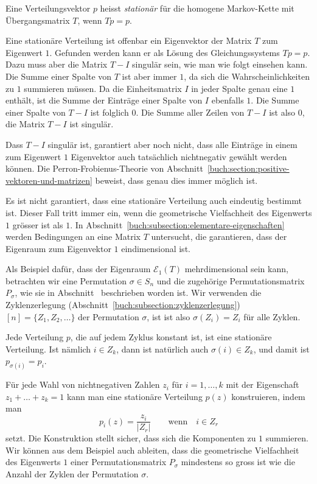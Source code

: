 \begin{definition}
Eine Verteilungsvektor $p$ heisst {\em stationär} für die
homogene Markov-Kette mit Übergangsmatrix $T$, wenn $Tp=p$.
%
\end{definition}

Eine stationäre Verteilung ist offenbar ein Eigenvektor der Matrix
$T$ zum Eigenwert $1$.
Gefunden werden kann er als Lösung des Gleichungssystems $Tp=p$.
Dazu muss aber die Matrix $T-I$ singulär sein, wie man wie folgt
einsehen kann.
Die Summe einer Spalte von $T$ ist aber immer $1$, da sich die
Wahrscheinlichkeiten zu $1$ summieren müssen.
Da die Einheitsmatrix $I$ in jeder Spalte
genau eine $1$ enthält, ist die Summe der Einträge einer Spalte von
$I$ ebenfalls $1$.
Die Summe einer Spalte von $T-I$ ist folglich $0$.
Die Summe aller Zeilen von $T-I$ ist also $0$, die Matrix $T-I$ 
ist singulär.

Dass $T-I$ singulär ist, garantiert aber noch nicht,
dass alle Einträge in einem zum Eigenwert $1$
Eigenvektor auch tatsächlich nichtnegativ gewählt werden können.
Die Perron-Frobienus-Theorie von
%
Abschnitt~\ref{buch:section:positive-vektoren-und-matrizen}
beweist, dass genau dies immer möglich ist.

Es ist nicht garantiert, dass eine stationäre Verteilung
auch eindeutig bestimmt ist.
Dieser Fall tritt immer ein, wenn die geometrische Vielfachheit
des Eigenwerts $1$ grösser ist als $1$.
In Abschnitt~\ref{buch:subsection:elementare-eigenschaften}
werden Bedingungen an eine Matrix $T$ untersucht, die garantieren,
dass der Eigenraum zum Eigenvektor $1$ eindimensional ist.

\begin{beispiel}
Als Beispiel dafür, dass der Eigenraum $\mathcal{E}_1(T)$
mehrdimensional sein kann, betrachten wir eine Permutation $\sigma\in S_n$
%
und die zugehörige Permutationsmatrix $P_\sigma$,
%
wie sie in Abschnitt~\label{buch:section:permutationsmatrizen}
beschrieben worden ist.
Wir verwenden die 
Zyklenzerlegung (Abschnitt~\ref{buch:subsection:zyklenzerlegung})
\(
[n] = \{ Z_1, Z_2,\dots \}
\)
der Permutation $\sigma$, ist ist also $\sigma(Z_i) = Z_i$ für alle
Zyklen.

Jede Verteilung $p$, die auf jedem Zyklus konstant ist, ist eine
stationäre Verteilung.
Ist nämlich $i\in Z_k$, dann ist natürlich auch $\sigma(i)\in Z_k$,
und damit ist $p_{\sigma(i)}=p_i$.

Für jede Wahl von nichtnegativen Zahlen $z_i$ für $i=1,\dots,k$
mit der Eigenschaft $z_1+\dots+z_k=1$ kann man eine stationäre
Verteilung $p(z)$ konstruieren, indem man
\[
p_i(z)
=
\frac{z_i}{|Z_r|}
\qquad\text{wenn}\quad i\in Z_r
\]
setzt.
Die Konstruktion stellt sicher, dass sich die Komponenten zu $1$
summieren.
Wir können aus dem Beispiel auch ableiten, dass die geometrische
Vielfachheit des Eigenwerts $1$ einer Permutationsmatrix $P_\sigma$ 
mindestens so gross ist wie die
Anzahl der Zyklen der Permutation $\sigma$.
\end{beispiel}

